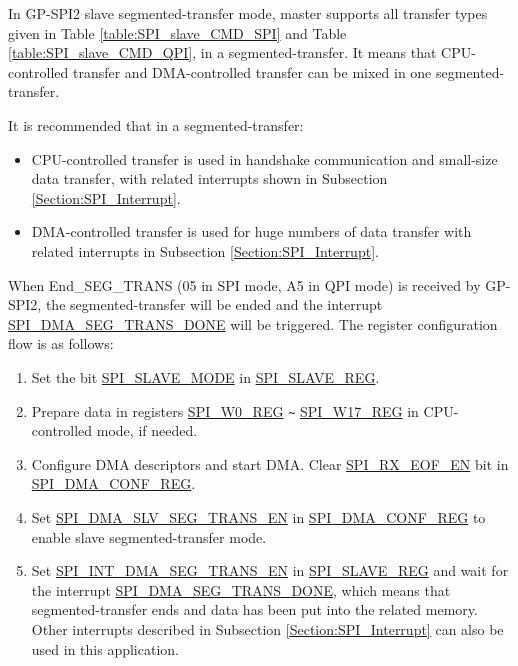 \documentclass[main\_\_EN.tex]{subfiles}
\begin{document}
In GP-SPI2 slave segmented-transfer mode, master supports all transfer types given in Table \ref{table:SPI_slave_CMD_SPI} and Table \ref{table:SPI_slave_CMD_QPI}, in a segmented-transfer. It means that CPU-controlled transfer and DMA-controlled transfer can be mixed in one segmented-transfer.

It is recommended that in a segmented-transfer:

\begin{itemize}
    \item CPU-controlled transfer is used in handshake communication and small-size data transfer, with related interrupts shown in Subsection \ref{Section:SPI_Interrupt}.

    \item  DMA-controlled transfer is used for huge numbers of data transfer with related interrupts in Subsection \ref{Section:SPI_Interrupt}.
\end{itemize}

When End\_SEG\_TRANS (\hexprefix{}05 in SPI mode, \hexprefix{}A5 in QPI mode) is received by GP-SPI2, the segmented-transfer will be ended and the interrupt \hyperref[fielddesc:SPIDMASEGTRANSDONE]{SPI\_DMA\_SEG\_TRANS\_DONE} will be triggered. The register configuration flow is as follows:

\begin{enumerate}
    \item Set the bit \hyperref[fielddesc:SPISLAVEMODE]{SPI\_SLAVE\_MODE} in \hyperref[regdesc:SPISLAVEREG]{SPI\_SLAVE\_REG}.
    \item Prepare data in registers \hyperref[regdesc:SPIW0REG]{SPI\_W0\_REG}  \verb+~+ \hyperref[regdesc:SPIW17REG]{SPI\_W17\_REG} in CPU-controlled mode, if needed.

    \item Configure DMA descriptors and start DMA. Clear \hyperref[fielddesc:SPIRXEOFEN]{SPI\_RX\_EOF\_EN} bit in \hyperref[regdesc:SPIDMACONFREG]{SPI\_DMA\_CONF\_REG}.

    \item Set \hyperref[fielddesc:SPIDMASLVSEGTRANSEN]{SPI\_DMA\_SLV\_SEG\_TRANS\_EN} in \hyperref[regdesc:SPIDMACONFREG]{SPI\_DMA\_CONF\_REG} to enable slave segmented-transfer mode.

    \item Set \hyperref[fielddesc:SPIINTDMASEGTRANSEN]{SPI\_INT\_DMA\_SEG\_TRANS\_EN} in \hyperref[regdesc:SPISLAVEREG]{SPI\_SLAVE\_REG} and wait for the interrupt \hyperref[fielddesc:SPIDMASEGTRANSDONE]{SPI\_DMA\_SEG\_TRANS\_DONE}, which means that segmented-transfer ends and data has been put into the related memory. Other interrupts described in Subsection \ref{Section:SPI_Interrupt} can also be used in this application.
\end{enumerate}
\end{document}
